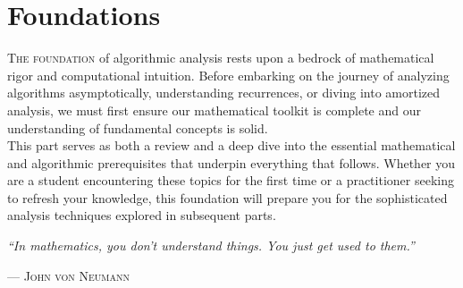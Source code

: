 \part{Foundations}
\label{part:foundations}

\begin{partintro}
	\lettrine[lines=3]{T}{he foundation} of algorithmic analysis rests upon a bedrock of mathematical rigor and computational intuition. Before embarking on the journey of analyzing algorithms asymptotically, understanding recurrences, or diving into amortized analysis, we must first ensure our mathematical toolkit is complete and our understanding of fundamental concepts is solid.
	\vspace{1em}\\
	This part serves as both a review and a deep dive into the essential mathematical and algorithmic prerequisites that underpin everything that follows. Whether you are a student encountering these topics for the first time or a practitioner seeking to refresh your knowledge, this foundation will prepare you for the sophisticated analysis techniques explored in subsequent parts.
	
	\vspace{1em}
	\hfill\textit{``In mathematics, you don't understand things. You just get used to them.''}
	
	\hfill--- \textsc{John von Neumann}
\end{partintro}

